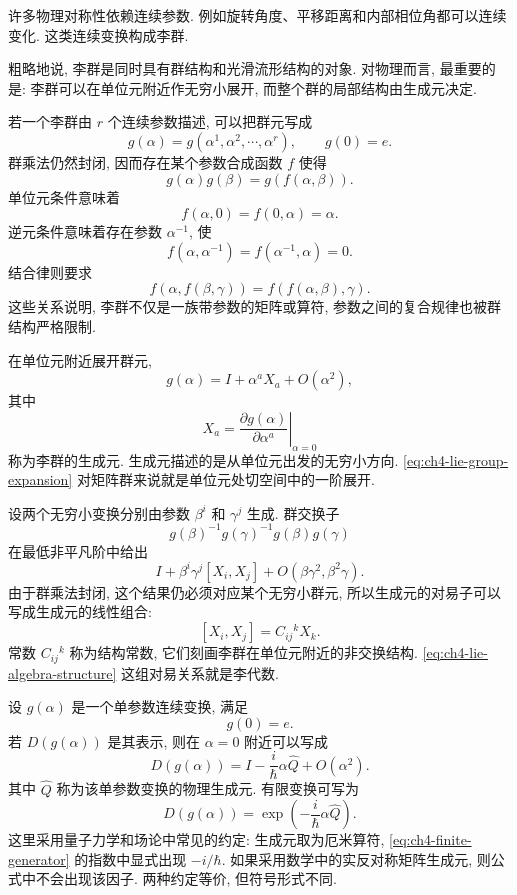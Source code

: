许多物理对称性依赖连续参数. 例如旋转角度、平移距离和内部相位角都可以连续变化. 这类连续变换构成李群. 

粗略地说, 李群是同时具有群结构和光滑流形结构的对象. 对物理而言, 最重要的是: 李群可以在单位元附近作无穷小展开, 而整个群的局部结构由生成元决定. 

若一个李群由 $r$ 个连续参数描述, 可以把群元写成
\[
g(\alpha)=g(\alpha^1,\alpha^2,\cdots,\alpha^r),
\qquad
g(0)=e.
\]
群乘法仍然封闭, 因而存在某个参数合成函数 $f$ 使得
\[
g(\alpha)g(\beta)=g(f(\alpha,\beta)).
\]
单位元条件意味着
\[
f(\alpha,0)=f(0,\alpha)=\alpha.
\]
逆元条件意味着存在参数 $\alpha^{-1}$, 使
\[
f(\alpha,\alpha^{-1})=f(\alpha^{-1},\alpha)=0.
\]
结合律则要求
\[
f(\alpha,f(\beta,\gamma))=f(f(\alpha,\beta),\gamma).
\]
这些关系说明, 李群不仅是一族带参数的矩阵或算符, 参数之间的复合规律也被群结构严格限制. 

在单位元附近展开群元,
\begin{equation}
\label{eq:ch4-lie-group-expansion}
g(\alpha)
=
I+\alpha^aX_a+O(\alpha^2),
\end{equation}
其中
\[
X_a=
\left.
\frac{\partial g(\alpha)}{\partial \alpha^a}
\right|_{\alpha=0}
\]
称为李群的生成元. 生成元描述的是从单位元出发的无穷小方向. \eqref{eq:ch4-lie-group-expansion} 对矩阵群来说就是单位元处切空间中的一阶展开. 

设两个无穷小变换分别由参数 $\beta^i$ 和 $\gamma^j$ 生成. 群交换子
\[
g(\beta)^{-1}g(\gamma)^{-1}g(\beta)g(\gamma)
\]
在最低非平凡阶中给出
\[
I+\beta^i\gamma^j[X_i,X_j]+O(\beta\gamma^2,\beta^2\gamma).
\]
由于群乘法封闭, 这个结果仍必须对应某个无穷小群元, 所以生成元的对易子可以写成生成元的线性组合:
\begin{equation}
\label{eq:ch4-lie-algebra-structure}
[X_i,X_j]=C_{ij}{}^kX_k.
\end{equation}
常数 $C_{ij}{}^k$ 称为结构常数, 它们刻画李群在单位元附近的非交换结构. \eqref{eq:ch4-lie-algebra-structure} 这组对易关系就是李代数. 

设 $g(\alpha)$ 是一个单参数连续变换, 满足
\[
g(0)=e.
\]
若 $D(g(\alpha))$ 是其表示, 则在 $\alpha=0$ 附近可以写成
\[
D(g(\alpha))
=
I-\frac{i}{\hbar}\alpha \hat{Q}+O(\alpha^2).
\]
其中 $\hat{Q}$ 称为该单参数变换的物理生成元. 有限变换可写为
\begin{equation}
\label{eq:ch4-finite-generator}
D(g(\alpha))
=
\exp\left(-\frac{i}{\hbar}\alpha\hat{Q}\right).
\end{equation}
这里采用量子力学和场论中常见的约定: 生成元取为厄米算符, \eqref{eq:ch4-finite-generator} 的指数中显式出现 $-i/\hbar$. 如果采用数学中的实反对称矩阵生成元, 则公式中不会出现该因子. 两种约定等价, 但符号形式不同. 

